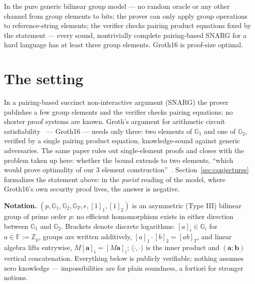 \documentclass{conjura-conjecture}
\newcommand{\Gone}{\mathbb{G}_1}
\newcommand{\Gtwo}{\mathbb{G}_2}
\newcommand{\GTt}{\mathbb{G}_T}
\newcommand{\FF}{\mathbb{F}}
\begin{document}

\vspace{0.4em}

\begin{informalconjecture}
In the pure generic bilinear group model --- no random
oracle or any other channel from group elements to bits; the prover
can only apply group operations to reference-string elements; the
verifier checks pairing product equations fixed by the statement ---
every sound, nontrivially complete pairing-based SNARG for a hard
language has at least three group elements.  Groth16 is proof-size
optimal.
\end{informalconjecture}

\section{The setting}\label{sec:setting}

In a pairing-based succinct non-interactive argument (SNARG) the
prover publishes a few group elements and the verifier checks
pairing equations; no shorter proof systems are known.
Groth's argument for arithmetic circuit satisfiability~\cite{Gro16}
--- Groth16 --- needs only three: two elements of $\Gone$ and one of
$\Gtwo$, verified by a single pairing product equation,
knowledge-sound against generic adversaries.  The same paper rules
out single-element proofs and closes with the problem taken up here:
whether the bound extends to two elements, ``which would prove
optimality of our 3 element construction''~\cite{Gro16}.
Section~\ref{sec:conjectures} formalizes the statement above: in the
\emph{purist} reading of the model, where Groth16's own security
proof lives, the answer is negative.

\smallskip
\noindent\textbf{Notation.}
$(p,\Gone,\Gtwo,\GTt,e,[1]_1,[1]_2)$ is an asymmetric (Type III)
bilinear group of prime order $p$: no efficient homomorphism exists
in either direction between $\Gone$ and $\Gtwo$.  Brackets denote
discrete logarithms: $[a]_i \in \mathbb{G}_i$ for
$a \in \FF := \mathbb{Z}_p$, groups are written additively,
$[a]_1 \cdot [b]_2 = [ab]_T$, and linear algebra lifts entrywise,
$M[\boldsymbol{a}]_i = [M\boldsymbol{a}]_i$; $\langle
\cdot,\cdot \rangle$ is the inner product and
$(\boldsymbol{a};\boldsymbol{b})$ vertical concatenation.
Everything below is publicly verifiable; nothing assumes zero
knowledge --- impossibilities are for plain soundness, a fortiori
for stronger notions.
\end{document}
